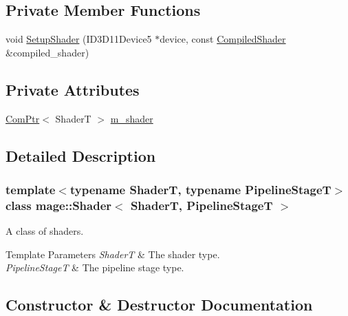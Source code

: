 \subsection*{Private Member Functions}
\begin{DoxyCompactItemize}
\item 
void \hyperlink{classmage_1_1_shader_a6328b035008e6c4ee957649f15f2c6b1}{Setup\+Shader} (I\+D3\+D11\+Device5 $\ast$device, const \hyperlink{classmage_1_1_compiled_shader}{Compiled\+Shader} \&compiled\+\_\+shader)
\end{DoxyCompactItemize}
\subsection*{Private Attributes}
\begin{DoxyCompactItemize}
\item 
\hyperlink{namespacemage_ae74f374780900893caa5555d1031fd79}{Com\+Ptr}$<$ ShaderT $>$ \hyperlink{classmage_1_1_shader_ac63260bdb25648451ddc1ee09d67c061}{m\+\_\+shader}
\end{DoxyCompactItemize}


\subsection{Detailed Description}
\subsubsection*{template$<$typename ShaderT, typename Pipeline\+StageT$>$\newline
class mage\+::\+Shader$<$ Shader\+T, Pipeline\+Stage\+T $>$}

A class of shaders.


\begin{DoxyTemplParams}{Template Parameters}
{\em ShaderT} & The shader type. \\
\hline
{\em Pipeline\+StageT} & The pipeline stage type. \\
\hline
\end{DoxyTemplParams}


\subsection{Constructor \& Destructor Documentation}
\hypertarget{classmage_1_1_shader_a70caa62e6ea79bd63e2d825850c4d6dc}{}\label{classmage_1_1_shader_a70caa62e6ea79bd63e2d825850c4d6dc} 
